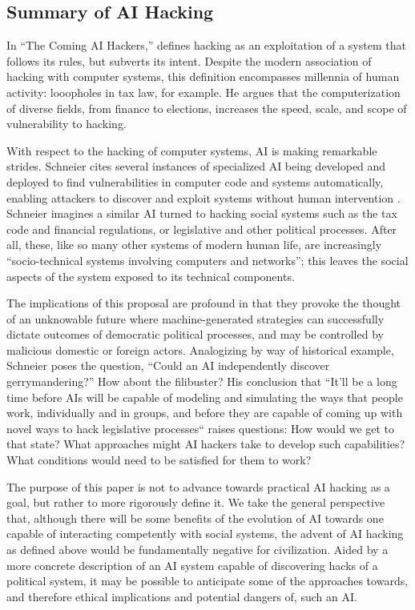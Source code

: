 \documentclass[nonacm,12pt]{acmart}
\begin{document}
\subsection{Summary of AI Hacking}

In ``The Coming AI Hackers,'' \citet{schneier_coming_2021} defines hacking as an exploitation of a system that follows its rules, but subverts its intent.  Despite the modern association of hacking with computer systems, this definition encompasses millennia of human activity: looopholes in tax law, for example.  He argues that the computerization of diverse fields, from finance to elections, increases the speed, scale, and scope of vulnerability to hacking.



With respect to the hacking of computer systems, AI is making remarkable strides.  Schneier cites several instances of specialized AI being developed and deployed to find vulnerabilities in computer code and systems automatically, enabling attackers to discover and exploit systems without human intervention \cite[p.~21]{schneier_coming_2021}.
Schneier imagines a similar AI turned to hacking social systems such as the tax code and financial regulations, or legislative and other political processes.  After all, these, like so many other systems of modern human life, are increasingly ``socio-technical systems involving computers and networks''; this leaves the social aspects of the system exposed to its technical components.

The implications of this proposal are profound in that they provoke the thought of an unknowable future where machine-generated strategies can successfully dictate outcomes of democratic political processes, and may be controlled by malicious domestic or foreign actors.
Analogizing by way of historical example, Schneier poses the question, ``Could an AI independently discover gerrymandering?''  
How about the filibuster?  
His conclusion that ``It’ll be a long time before AIs will be capable of modeling and simulating the ways that people work, individually and in groups, and before they are capable of coming up with novel ways to hack legislative processes`` raises questions: How would we get to that state?  
What approaches might AI hackers take to develop such capabilities?
What conditions would need to be satisfied for them to work?

The purpose of this paper is not to advance towards practical AI hacking as a goal, but rather to more rigorously define it.  We take the general perspective that, although there will be some benefits of the evolution of AI towards one capable of interacting competently with social systems, the advent of AI hacking as defined above would be fundamentally negative for civilization. Aided by a more concrete description of an AI system capable of discovering hacks of a political system, it may be possible to anticipate some of the approaches towards, and therefore ethical implications and potential dangers of, such an AI.
\end{document}
